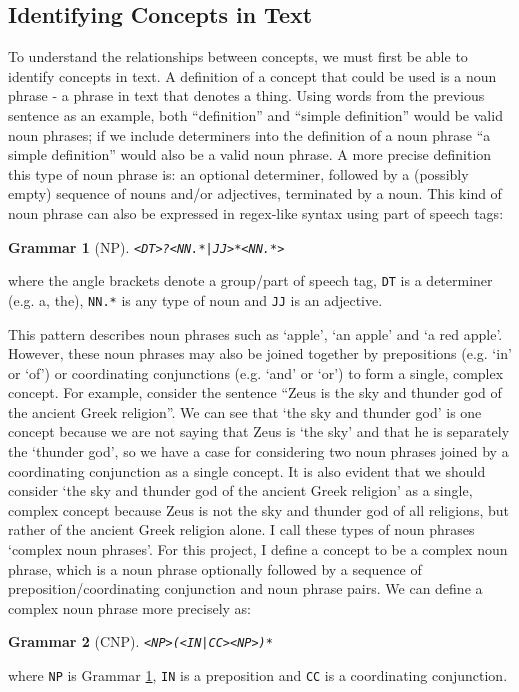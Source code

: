 \documentclass[12pt]{article}
\theoremstyle{grammarstyle}
\newtheorem{gram}{Grammar}
\begin{document}
\subsection{Identifying Concepts in Text} \label{sec:idenifying_concepts}
To understand the relationships between concepts, we must first be able to identify concepts in text. A definition of a concept that could be used is a noun phrase - a phrase in text that denotes a thing. Using words from the previous sentence as an example, both ``definition'' and ``simple definition'' would be valid noun phrases; if we include determiners  into the definition of a noun phrase ``a simple definition'' would also be a valid noun phrase. A more precise definition this type of noun phrase is: an optional determiner, followed by a (possibly empty) sequence of nouns and/or adjectives, terminated by a noun. This kind of noun phrase can also be expressed in regex-like syntax using part of speech tags: 
\begin{gram}[NP] \label{gr:np_pattern}
    \texttt{<DT>?<NN.*|JJ>*<NN.*>}    
\end{gram}
\noindent
where the angle brackets denote a group/part of speech tag, \texttt{DT} is a determiner (e.g. a, the), \texttt{NN.*} is any type of noun and \texttt{JJ} is an adjective.

This pattern describes noun phrases such as `apple', `an apple' and `a red apple'.  However, these noun phrases may also be joined together by prepositions (e.g. `in' or `of') or coordinating conjunctions (e.g. `and'  or `or') to form a single, complex concept. For example, consider the sentence ``Zeus is the sky and thunder god of the ancient Greek religion''. We can see that  `the sky and thunder god' is one concept because we are not saying that Zeus is `the sky' and that he is separately the `thunder god', so we have a case for considering two noun phrases joined by a coordinating conjunction as a single concept. It is also evident that we should consider `the sky and thunder god of the ancient Greek religion' as a single, complex concept because Zeus is not the sky and thunder god of all religions, but rather of the ancient Greek religion alone. 
I call these types of noun phrases `complex noun phrases'. For this project, I define a concept to be a complex noun phrase, which is a noun phrase optionally followed by a sequence of preposition/coordinating conjunction and noun phrase pairs. We can define a complex noun phrase more precisely as: 
\begin{gram}[CNP] \label{gr:cnp_pattern}
    \texttt{<NP>(<IN|CC><NP>)*}
\end{gram}
\noindent
where \texttt{NP} is Grammar \ref{gr:np_pattern}, \texttt{IN} is a preposition and \texttt{CC} is a coordinating conjunction. 
\end{document}
